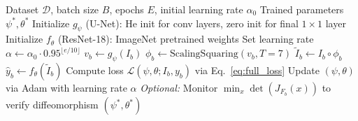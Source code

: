 \begin{algorithm}[t]
\caption{DCA Training Procedure}
\label{alg:training}
\begin{algorithmic}[1]
\REQUIRE Dataset $\mathcal{D}$, batch size $B$, epochs $E$, initial learning rate $\alpha_0$
\ENSURE Trained parameters $\psi^*, \theta^*$
\STATE Initialize $g_\psi$ (U-Net): He init for conv layers, zero init for final $1 \times 1$ layer
\STATE Initialize $f_\theta$ (ResNet-18): ImageNet pretrained weights
    \STATE Set learning rate $\alpha \leftarrow \alpha_0 \cdot 0.95^{\lfloor e/10 \rfloor}$
        \STATE $v_b \leftarrow g_\psi(I_b)$ \quad {}
        \STATE $\phi_b \leftarrow \text{ScalingSquaring}(v_b, T=7)$ \quad {}
        \STATE $\tilde{I}_b \leftarrow I_b \circ \phi_b$ \quad {}
        \STATE $\hat{y}_b \leftarrow f_\theta(\tilde{I}_b)$ \quad {}
        \STATE Compute loss $\mathcal{L}(\psi, \theta; I_b, y_b)$ via Eq.~\eqref{eq:full_loss}
        \STATE Update $(\psi, \theta)$ via Adam with learning rate $\alpha$
        \STATE \textit{Optional:} Monitor $\min_x \det(J_{F_b}(x))$ to verify diffeomorphism
    \ENDFOR
\ENDFOR
\RETURN $(\psi^*, \theta^*)$
\end{algorithmic}
\end{algorithm}